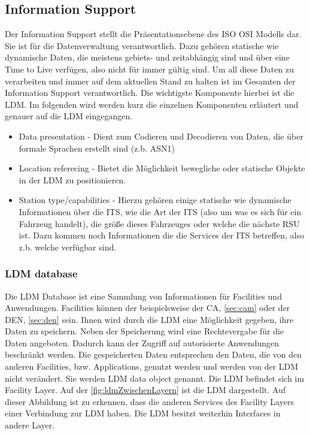 \subsection{Information Support}
Der Information Support stellt die Präsentationsebene des \ac{ISO} \ac{OSI} Modells dar. Sie ist für die Datenverwaltung verantwortlich. Dazu gehören statische wie dynamische Daten, die meistens gebiets- und zeitabhängig sind und über eine Time to Live verfügen, also nicht für immer gültig sind. Um all diese Daten zu verarbeiten und immer auf dem aktuellen Stand zu halten ist im Gesamten der Information Support verantwortlich. Die wichtigste Komponente hierbei ist die \ac{LDM}. Im folgenden wird werden kurz die einzelnen Komponenten erläutert und genauer auf die LDM eingegangen.
\begin{itemize}
\item Data presentation - Dient zum Codieren und Decodieren von Daten, die über formale Sprachen erstellt sind (z.b. ASN1)
\item Location referecing - Bietet die Möglichkeit bewegliche oder statische Objekte in der LDM zu positionieren. 
\item Station type/capabilities - Hierzu gehören einige statische wie dynamische Informationen über die ITS, wie die Art der ITS (also um was es sich für ein Fahrzeug handelt), die größe dieses Fahrzeuges oder welche die nächste RSU ist. Dazu kommen noch Informationen die die Services der ITS betreffen, also z.b. welche verfügbar sind.
\end{itemize}

\subsubsection{LDM database \label{facilitylayer_ldmdatabase}}
Die \ac{LDM} Database ist eine Sammlung von Informationen für Facilities und Anwendungen. Facilities können der beispielsweise der \ac{CA}, \autoref{sec:cam} oder der \ac{DEN}, \autoref{sec:den} sein. Ihnen wird durch die \ac{LDM} eine Möglichkeit gegeben, ihre Daten zu speichern. Neben der Speicherung wird eine Rechtevergabe für die Daten angeboten. Dadurch kann der Zugriff auf autorisierte Anwendungen beschränkt werden. Die gespeicherten Daten entsprechen den Daten, die von den anderen Facilities, bzw. Applications, genutzt werden und  werden von der  \ac{LDM} nicht verändert. Sie werden \ac{LDM} data object genannt. 
Die \ac{LDM} befindet sich im Facility Layer. Auf der \autoref{fig:ldmZwischenLayern} ist die \ac{LDM} dargestellt. Auf dieser Abbildung ist zu erkennen, dass die anderen Services des Facility Layers einer Verbindung zur \ac{LDM} haben. Die \ac{LDM} besitzt weiterhin Interfaces in andere Layer.

